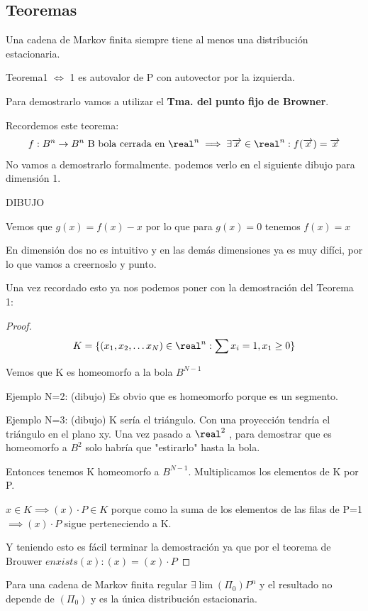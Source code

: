 \subsection{Teoremas}
\begin{theorem}[Teorema 1]
	\label{Markov_tma1}
	Una cadena de Markov finita siempre tiene al menos una distribución estacionaria.
\end{theorem}

	\obs Teorema1 $\iff$ 1 es autovalor de P con autovector por la izquierda.


	Para demostrarlo vamos a utilizar el \textbf{Tma. del punto fijo de Browner}.


	Recordemos este teorema:
	$$f: B^n \rightarrow B^n  \text{  B bola cerrada en }\real^n \implies \exists \overrightarrow x \in \real^n : f(\overrightarrow x ) = \overrightarrow x$$
	No vamos a demostrarlo formalmente. podemos verlo en el siguiente dibujo para dimensión 1.

	DIBUJO

	Vemos que $g(x) = f(x) - x$ por lo que para $g(x) = 0$ tenemos $f(x) = x$

	En dimensión dos no es intuitivo y en las demás dimensiones ya es muy difíci, por lo que vamos a creernoslo y punto.

	Una vez recordado esto ya nos podemos poner con la demostración del Teorema 1:
	\begin{proof}
	$$K = \{(x_1 , x_2, \ldots x_N) \in \real^n : \sum x_i = 1 , x_1 \geq 0\}$$

	Vemos que K es homeomorfo a la bola $B^{N-1}$

	Ejemplo N=2:
	(dibujo)
	Es obvio que es homeomorfo porque es un segmento.

	Ejemplo N=3:
	(dibujo)
	K sería el triángulo. Con una proyección tendría el triángulo en el plano xy.
	Una vez pasado a $\real^2$ , para demostrar que es homeomorfo a $B^2$ solo habría que "estirarlo" hasta la bola.

	Entonces tenemos K homeomorfo a $B^{N-1}$. Multiplicamos los elementos de K por P.

	$x \in K \implies (x)\cdot P \in K$ porque como la suma de los elementos de las filas de P=1 $\implies (x)\cdot P$ sigue perteneciendo a K.

	Y teniendo esto es fácil terminar la demostración ya que por el teorema de Brouwer $enxists (x) : (x) = (x)\cdot P$
\end{proof}

\begin{theorem}[Teorema 2]
	\label{Markov_tma2}
	Para una cadena de Markov finita regular $\exists \lim (\Pi_0) P^n$ y el resultado no depende de $(\Pi_0)$ y es la única distribución estacionaria.
\end{theorem}

